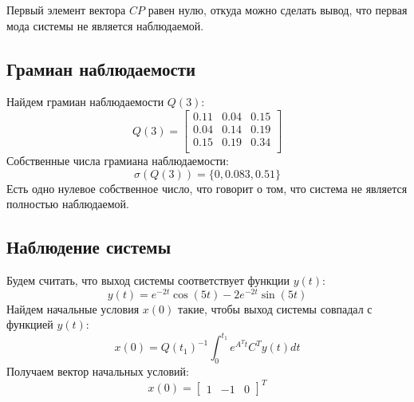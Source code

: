 Первый элемент вектора $CP$ равен нулю, откуда можно сделать вывод, что первая мода системы не является наблюдаемой. 

\subsection{Грамиан наблюдаемости}
Найдем грамиан наблюдаемости $Q(3)$:
\begin{equation}
    Q(3) = \begin{bmatrix}
        0.11  & 0.04  & 0.15 \\ 
        0.04  & 0.14  & 0.19 \\ 
        0.15  & 0.19  & 0.34 \\ 
        \end{bmatrix}
\end{equation}
Собственные числа грамиана наблюдаемости:
\begin{equation}
    \sigma(Q(3)) = \{0, 0.083, 0.51\}
\end{equation}
Есть одно нулевое собственное число, что говорит о том, что система не является полностью наблюдаемой.

\subsection{Наблюдение системы}
Будем считать, что выход системы соответствует функции $y(t)$:
\begin{equation}
    y(t) = e^{-2t} \cos(5t) -2e^{-2t} \sin(5t) 
\end{equation}
Найдем начальные условия $x(0)$ такие, чтобы выход системы совпадал с функцией $y(t)$:
\begin{equation}
    x(0) = Q(t_1)^{-1} \int_0^{t_1} e^{A^Tt}C^Ty(t)dt
\end{equation}
Получаем вектор начальных условий:
\begin{equation}
    x(0) = \begin{bmatrix}
        1 & -1 & 0
    \end{bmatrix}^T
\end{equation}

